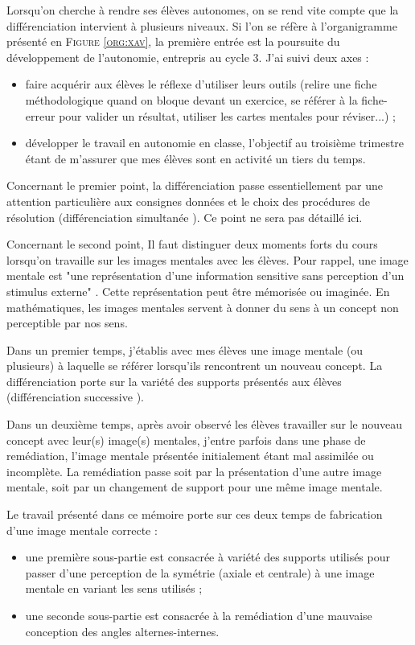 Lorsqu'on cherche à rendre ses élèves autonomes, on se rend vite compte que la différenciation intervient à plusieurs niveaux. Si l'on se réfère à l'organigramme présenté en \textsc{Figure \ref{org:xav}}, la première entrée est la poursuite du développement de l'autonomie, entrepris au cycle 3. J'ai suivi deux axes :
\begin{itemize}
    \item faire acquérir aux élèves le réflexe d'utiliser leurs outils (relire une fiche méthodologique quand on bloque devant un exercice, se référer à la fiche-erreur pour valider un résultat, utiliser les cartes mentales pour réviser...) ;
    \item développer le travail en autonomie en classe, l'objectif au troisième trimestre étant de m'assurer que mes élèves sont en activité un tiers du temps.
\end{itemize}
Concernant le premier point, la différenciation passe essentiellement par une attention particulière aux consignes données et le choix des procédures de résolution (différenciation simultanée \cite{Eduscol}). Ce point ne sera pas détaillé ici.

Concernant le second point, Il faut distinguer deux moments forts du cours lorsqu'on travaille sur les images mentales avec les élèves. Pour rappel, une image mentale est "une représentation d'une information sensitive sans perception d'un stimulus externe" \cite{mimagery}. Cette représentation peut être mémorisée ou imaginée. En mathématiques, les images mentales servent à donner du sens à un concept non perceptible par nos sens. 

Dans un premier temps, j'établis avec mes élèves une image mentale (ou plusieurs) à laquelle se référer lorsqu'ils rencontrent un nouveau concept. La différenciation porte sur la variété des supports présentés aux élèves (différenciation successive \cite{Eduscol}).

Dans un deuxième temps, après avoir observé les élèves travailler sur le nouveau concept avec leur(s) image(s) mentales, j'entre parfois dans une phase de remédiation, l'image mentale présentée initialement étant mal assimilée ou incomplète. La remédiation passe soit par la présentation d'une autre image mentale, soit par un changement de support pour une même image mentale.

Le travail présenté dans ce mémoire porte sur ces deux temps de fabrication d'une image mentale correcte :
\begin{itemize}
    \item une première sous-partie est consacrée à variété des supports utilisés pour passer d'une perception de la symétrie (axiale et centrale) à une image mentale en variant les sens utilisés ;
    \item une seconde sous-partie est consacrée à la remédiation d'une mauvaise conception des angles alternes-internes.
\end{itemize}

